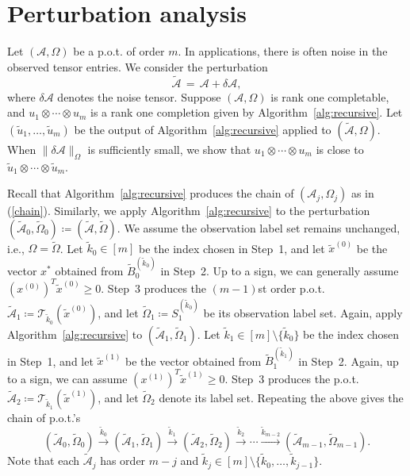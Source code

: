 \documentclass{amsart}
\newcommand{\dt}{\delta}
\newcommand{\tomg}{\widetilde{\Omega}}
\newcommand{\tu}{\tilde{u}}
\newcommand{\tx}{\tilde{x}}
\newcommand{\tk}{\tilde{k}}
\newcommand{\reff}[1]{(\ref{#1})}
\newcommand{\mc}[1]{\mathcal{#1}}
\newcommand{\ddd}{,\ldots,}
\newcommand{\be}{\begin{equation}}
\newcommand{\ee}{\end{equation}}
\theoremstyle{definition}
\numberwithin{equation}{section}
\begin{document}
\section{Perturbation analysis}\label{sc:perturb}


Let $(\mc{A}, \Omega)$ be a p.o.t. of order $m$.
In applications, there is often noise in the observed tensor entries.
We consider the perturbation
\[
\widetilde{\mc{A}} \,=\, \mc{A}  + \dt \mc{A},
\]
where $\dt \mc{A}$ denotes the noise tensor.
Suppose $(\mc{A}, \Omega)$ is rank one completable, 
and $u_1 \otimes \cdots \otimes u_m$ is a rank one completion given by Algorithm~\ref{alg:recursive}.
Let $(\tu_1 \ddd \tu_m)$ be the output of Algorithm~\ref{alg:recursive} applied to $(\widetilde{\mc{A}}, \Omega)$.
When $\|\dt \mc{A}\|_{\Omega}$ is sufficiently small, we show that
$u_1 \otimes \cdots \otimes u_m$ is close to $\tu_1 \otimes \cdots \otimes \tu_m$.






Recall that Algorithm~\ref{alg:recursive} produces the chain of $(\mc{A}_j, \Omega_j)$ as in \reff{chain}.
Similarly, we apply Algorithm~\ref{alg:recursive} to the perturbation 
$(\widetilde{\mc{A}}_0,\tomg_0)\coloneqq(\widetilde{\mc{A}},\tomg)$.
We assume the observation label set remains unchanged, i.e., $\Omega = \tomg$.
Let $\tk_0 \in [m]$ be the index chosen in Step~1, 
and let $\tx^{(0)}$ be the vector $x^*$ obtained from $\widetilde{B}_0^{(\tk_0)}$ in Step~2.
Up to a sign, we can generally assume $(x^{(0)})^T\tx^{(0)} \ge 0$.
Step~3 produces the $(m-1)$st order p.o.t. $\widetilde{\mc{A}}_1 \coloneqq \mc{T}_{\tk_0}(\tx^{(0)})$, and let $\tomg_1 \coloneqq S_1^{(\tk_0)}$ be its observation label set.
Again, apply Algorithm~\ref{alg:recursive} to $(\widetilde{\mc{A}}_1, \tomg_1)$.
Let $\tk_1 \in [m] \setminus \{\tk_0\}$ be the index chosen in Step~1,
and let $\tx^{(1)}$ be the vector obtained from $\widetilde{B}_1^{(\tk_1)}$ in Step~2.
Again, up to a sign, we can assume $(x^{(1)})^T\tx^{(1)} \ge 0$.
Step~3 produces the p.o.t. $\widetilde{\mc{A}}_2 \coloneqq \mc{T}_{\tk_1}(\tx^{(1)})$,
and let $\tomg_2$ denote its label set.
Repeating the above gives the chain of p.o.t.'s
\be\label{chain_pert}
(\widetilde{\mc{A}}_0, \tomg_0) 
\overset{\tk_0}{\longrightarrow} (\widetilde{\mc{A}}_1, \tomg_1) 
\overset{\tk_1}{\longrightarrow} (\widetilde{\mc{A}}_2, \tomg_2)
\overset{\tk_2}{\longrightarrow}
\cdots 
\overset{\tk_{m-2}}{\longrightarrow} (\widetilde{\mc{A}}_{m-1},\tomg_{m-1}).
\ee
Note that each $\widetilde{\mc{A}}_j$ has order $m-j$ and 
$
\tk_j \in [m] \setminus \{ \tk_0 \ddd \tk_{j-1} \}.
$
\end{document}
